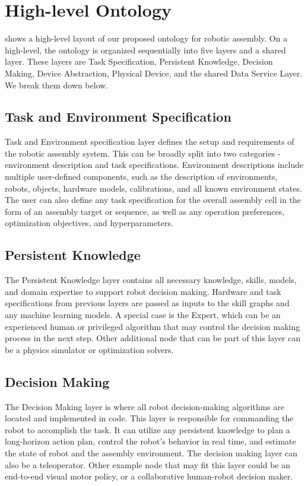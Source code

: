\documentclass{article}
\begin{document}
 
\section{High-level Ontology}
 shows a high-level layout of our proposed ontology for robotic assembly. On a high-level, the ontology is organized sequentially into five layers and a shared layer. These layers are Task Specification, Persistent Knowledge, Decision Making, Device Abstraction, Physical Device, and the shared Data Service Layer. We break them down below.

\subsection{Task and Environment Specification}
Task and Environment specification layer defines the setup and requirements of the robotic assembly system. This can be broadly split into two categories - environment description and task specifications. Environment descriptions include multiple user-defined components, such as the description of environments, robots, objects, hardware models, calibrations, and all known environment states. The user can also define any task specification for the overall assembly cell in the form of an assembly target or sequence, as well as any operation preferences, optimization objectives, and hyperparameters. 

\subsection{Persistent Knowledge}
The Persistent Knowledge layer contains all necessary knowledge, skills, models, and domain expertise to support robot decision making. Hardware and task specifications from previous layers are passed as inputs to the skill graphs and any machine learning models. A special case is the Expert, which can be an experienced human or privileged algorithm that may control the decision making process in the next step. Other additional node that can be part of this layer can be a physics simulator or optimization solvers.


\subsection{Decision Making}
The Decision Making layer is where all robot decision-making algorithms are located and implemented in code. This layer is responsible for commanding the robot to accomplish the task. It can utilize any persistent knowledge to plan a long-horizon action plan, control the robot's behavior in real time, and estimate the state of robot and the assembly environment. The decision making layer can also be a teleoperator. Other example node that may fit this layer could be an end-to-end visual motor policy, or a collaborative human-robot decision maker.
\end{document}
